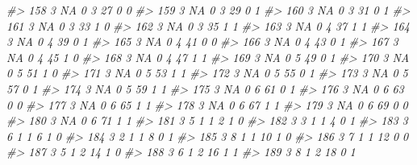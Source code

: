 \documentclass[]{book}
\newenvironment{Shaded}{\begin{snugshade}}{\end{snugshade}}
\newcommand{\CommentTok}[1]{\textcolor[rgb]{0.56,0.35,0.01}{\textit{#1}}}
\begin{document}
\begin{Shaded}
\begin{Highlighting}[]
\CommentTok{#> 158     3        NA         0     3    27           0            0}
\CommentTok{#> 159     3        NA         0     3    29           0            1}
\CommentTok{#> 160     3        NA         0     3    31           0            1}
\CommentTok{#> 161     3        NA         0     3    33           1            0}
\CommentTok{#> 162     3        NA         0     3    35           1            1}
\CommentTok{#> 163     3        NA         0     4    37           1            1}
\CommentTok{#> 164     3        NA         0     4    39           0            1}
\CommentTok{#> 165     3        NA         0     4    41           0            0}
\CommentTok{#> 166     3        NA         0     4    43           0            1}
\CommentTok{#> 167     3        NA         0     4    45           1            0}
\CommentTok{#> 168     3        NA         0     4    47           1            1}
\CommentTok{#> 169     3        NA         0     5    49           0            1}
\CommentTok{#> 170     3        NA         0     5    51           1            0}
\CommentTok{#> 171     3        NA         0     5    53           1            1}
\CommentTok{#> 172     3        NA         0     5    55           0            1}
\CommentTok{#> 173     3        NA         0     5    57           0            1}
\CommentTok{#> 174     3        NA         0     5    59           1            1}
\CommentTok{#> 175     3        NA         0     6    61           0            1}
\CommentTok{#> 176     3        NA         0     6    63           0            0}
\CommentTok{#> 177     3        NA         0     6    65           1            1}
\CommentTok{#> 178     3        NA         0     6    67           1            1}
\CommentTok{#> 179     3        NA         0     6    69           0            0}
\CommentTok{#> 180     3        NA         0     6    71           1            1}
\CommentTok{#> 181     3         5         1     1     2           1            0}
\CommentTok{#> 182     3         3         1     1     4           0            1}
\CommentTok{#> 183     3         6         1     1     6           1            0}
\CommentTok{#> 184     3         2         1     1     8           0            1}
\CommentTok{#> 185     3         8         1     1    10           1            0}
\CommentTok{#> 186     3         7         1     1    12           0            0}
\CommentTok{#> 187     3         5         1     2    14           1            0}
\CommentTok{#> 188     3         6         1     2    16           1            1}
\CommentTok{#> 189     3         8         1     2    18           0            1}

\end{Highlighting}
\end{Shaded}
\end{document}
